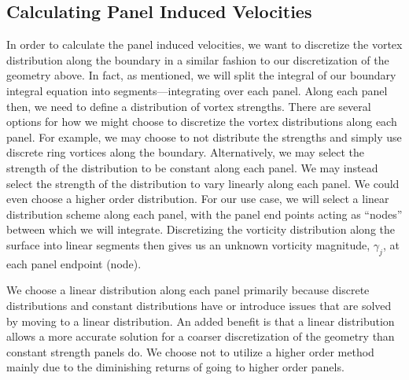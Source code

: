 %
%


\subsection{Calculating Panel Induced Velocities}


In order to calculate the panel induced velocities, we want to discretize the vortex distribution along the boundary in a similar fashion to our discretization of the geometry above.
%
In fact, as mentioned, we will split the integral of our boundary integral equation into segments---integrating over each panel.
%
Along each panel then, we need to define a distribution of vortex strengths.
%
There are several options for how we might choose to discretize the vortex distributions along each panel.
%
For example, we may choose to not distribute the strengths and simply use discrete ring vortices along the boundary.
%
Alternatively, we may select the strength of the distribution to be constant along each panel.
%
We may instead select the strength of the distribution to vary linearly along each panel.
%
We could even choose a higher order distribution.
%
For our use case, we will select a linear distribution scheme along each panel, with the panel end points acting as ``nodes'' between which we will integrate.
%
Discretizing the vorticity distribution along the surface into linear segments then gives us an unknown vorticity magnitude, \(\gamma_j\), at each panel endpoint (node).

We choose a linear distribution along each panel primarily because discrete distributions and constant distributions have or introduce issues that are solved by moving to a linear distribution.
%
An added benefit is that a linear distribution allows a more accurate solution for a coarser discretization of the geometry than constant strength panels do.
%
We choose not to utilize a higher order method mainly due to the diminishing returns of going to higher order panels.

